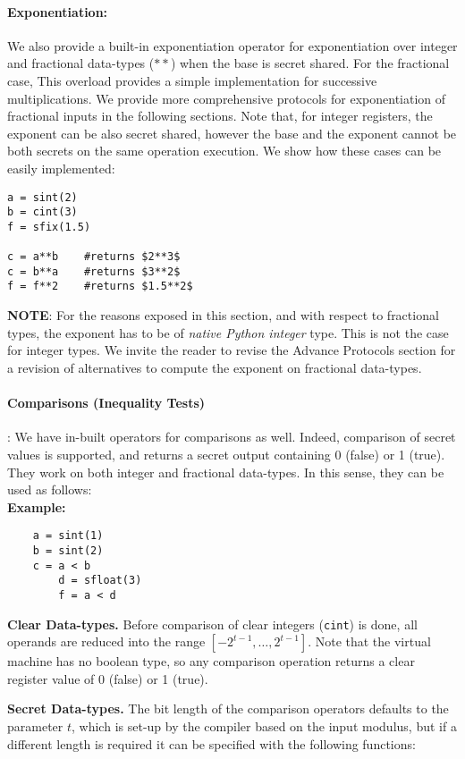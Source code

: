 \paragraph{Exponentiation:}
We also provide a built-in exponentiation operator for exponentiation over integer and 
fractional data-types ($**$) when the base is secret shared. 
For the fractional case, 
This overload provides a simple implementation for successive multiplications. 
We provide more comprehensive protocols for exponentiation of fractional inputs 
in the following sections. 
Note that, for integer registers, the exponent can be also secret shared, 
however the base and the exponent cannot be both secrets on the same operation execution. 
We show how these cases can be easily implemented: 
\begin{lstlisting}
a = sint(2)
b = cint(3)
f = sfix(1.5)

c = a**b 	#returns $2**3$
c = b**a 	#returns $3**2$
f = f**2	#returns $1.5**2$
\end{lstlisting}
\textbf{NOTE}: For the reasons exposed in this section, and with respect to fractional types, 
the exponent has to be of \textit{native Python integer} type. 
This is not the case for integer types. We invite the reader to revise the Advance Protocols 
section for a revision of alternatives to compute the exponent on fractional data-types.
\\
\paragraph{Comparisons (Inequality Tests)}:
We have in-built operators for comparisons as well. 
Indeed, comparison of secret values is supported, 
and returns a secret output containing 0 (false) or 1 (true).
They work on both integer and fractional data-types. 
In this sense, they can be used as follows: \\
\textbf{Example:}
\begin{lstlisting}
	a = sint(1)
	b = sint(2)
	c = a < b
        d = sfloat(3)
        f = a < d
\end{lstlisting}

\noindent
\textbf{Clear Data-types.} Before comparison of clear integers (\verb|cint|) is done,
all operands are reduced into the range $[-2^{t-1}, \dots, 2^{t-1}]$.
Note that the virtual machine has no boolean type,
so any comparison operation returns a clear register value of 0
(false) or 1 (true).

\noindent
\textbf{Secret Data-types.}  
The bit length of the comparison operators defaults to the parameter $t$, 
which is set-up by the compiler based on the input modulus, 
but if a different length is required it can be specified with the following functions:

